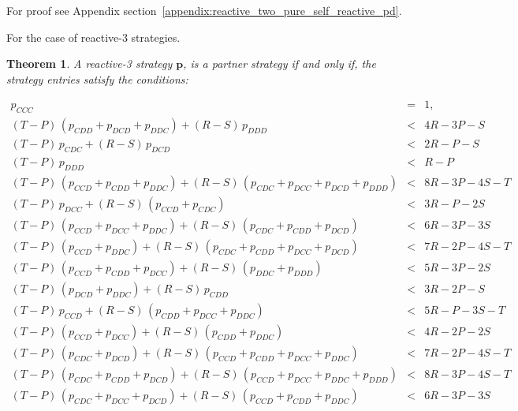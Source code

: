 \documentclass[11pt]{article}
\theoremstyle{plainCl1}
\newtheorem{theorem}{Theorem}
\theoremstyle{plainCl2}
\begin{document}
For proof see Appendix section~\ref{appendix:reactive_two_pure_self_reactive_pd}.


For the case of reactive-3 strategies.

\begin{theorem}\label{theorem:reactive_three_partner_strategies_PD}
A reactive-3 strategy $\mathbf{p}$, is a partner strategy if and only if,
the strategy entries satisfy the conditions:

\begin{equation*}
  \begin{array}{ccc}
    p_{CCC} & = & 1, \\ [0.2cm]
    (T - P)\, (p_{CDD} + p_{DCD} + p_{DDC}) + (R - S)\, p_{DDD}  & < & 4 R - 3 P  - S \\ [0.2cm]
    (T - P)\, p_{CDC}  + (R - S)\, p_{DCD}  & < & 2 R - P  - S \\ [0.2cm]
    (T - P)\, p_{DDD} & < & R - P\\ [0.2cm]
    (T - P)\,(p_{CCD} + p_{CDD} + p_{DDC}) + (R - S)\,(p_{CDC} + p_{DCC} + p_{DCD} + p_{DDD}) & < & 8 R - 3 P - 4 S - T \\ [0.2cm]
    (T - P)\, p_{DCC}  + (R - S)\,(p_{CCD} + p_{CDC}) & < & 3 R - P - 2 S \\ [0.2cm]
    (T - P)\,(p_{CCD} + p_{DCC} + p_{DDC}) + (R - S)\,(p_{CDC} + p_{CDD} + p_{DCD}) & < & 6 R - 3 P - 3 S \\ [0.2cm]
    (T - P)\,(p_{CCD} + p_{DDC}) + (R - S)\,(p_{CDC} + p_{CDD} + p_{DCC} + p_{DCD}) & < & 7 R - 2 P - 4 S - T \\ [0.2cm]
    (T - P)\,(p_{CCD} + p_{CDD} + p_{DCC}) + (R - S)\,(p_{DDC} + p_{DDD}) & < & 5 R - 3 P - 2 S \\ [0.2cm]
    (T - P)\,(p_{DCD} + p_{DDC}) + (R - S)\, p_{CDD}  & < & 3 R - 2 P - S \\ [0.2cm] 
    (T - P)\, p_{CCD} + (R - S)\,(p_{CDD} + p_{DCC} + p_{DDC}) & < & 5 R - P - 3 S - T \\ [0.2cm]
    (T - P)\,(p_{CCD} + p_{DCC}) + (R - S)\,(p_{CDD} + p_{DDC}) & < & 4 R - 2 P - 2 S \\ [0.2cm]
    (T - P)\,(p_{CDC} + p_{DCD}) + (R - S)\,(p_{CCD} + p_{CDD} + p_{DCC} + p_{DDC}) & < & 7 R - 2 P - 4 S - T \\ [0.2cm]
    (T - P)\,(p_{CDC} + p_{CDD} + p_{DCD}) + (R - S)\,(p_{CCD} + p_{DCC} + p_{DDC} + p_{DDD}) & < & 8 R - 3 P - 4 S - T \\ [0.2cm]
    (T - P)\,(p_{CDC} + p_{DCC} + p_{DCD}) + (R - S)\,(p_{CCD} + p_{CDD} + p_{DDC}) & < & 6 R - 3 P - 3 S \\ [0.2cm]

\end{array}
\end{equation*}
\end{theorem}
\end{document}
